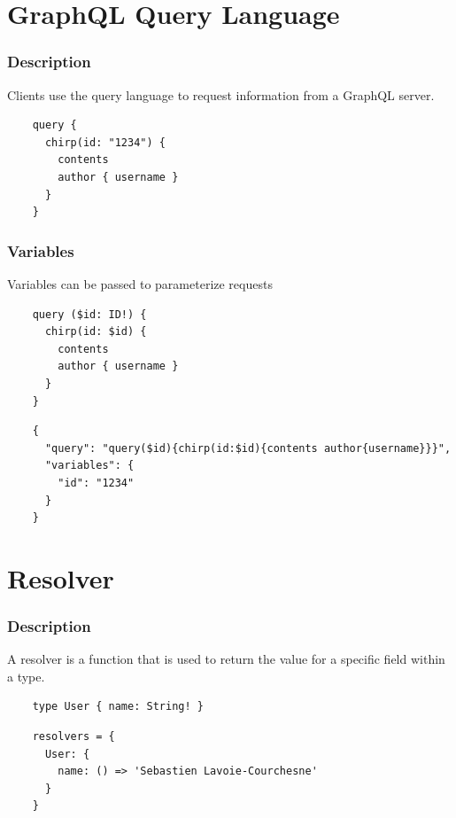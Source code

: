 \documentclass{beamer}
\begin{document}
\section{GraphQL Query Language}
\begin{frame}[fragile]
  \frametitle{Description}
  Clients use the query language to request information from a GraphQL server.

  \vspace{1em}
  \begin{verbatim}
    query {
      chirp(id: "1234") {
        contents
        author { username }
      }
    }
  \end{verbatim}
\end{frame}


\begin{frame}[fragile]
  \frametitle{Variables}
  Variables can be passed to parameterize requests

  \vspace{1em}
  \begin{verbatim}
    query ($id: ID!) {
      chirp(id: $id) {
        contents
        author { username }
      }
    }
  \end{verbatim}

  \vspace{1em}
  \begin{verbatim}
    {
      "query": "query($id){chirp(id:$id){contents author{username}}}",
      "variables": {
        "id": "1234"
      }
    }
  \end{verbatim}
\end{frame}


\section{Resolver}
\begin{frame}[fragile]
  \frametitle{Description}
  A resolver is a function that is used to return the value for a specific field within a type.

  \vspace{1em}
  \begin{verbatim}
    type User { name: String! }
  \end{verbatim}

  \vspace{1em}
  \begin{verbatim}
    resolvers = {
      User: {
        name: () => 'Sebastien Lavoie-Courchesne'
      }
    }
  \end{verbatim}
\end{frame}
\end{document}
